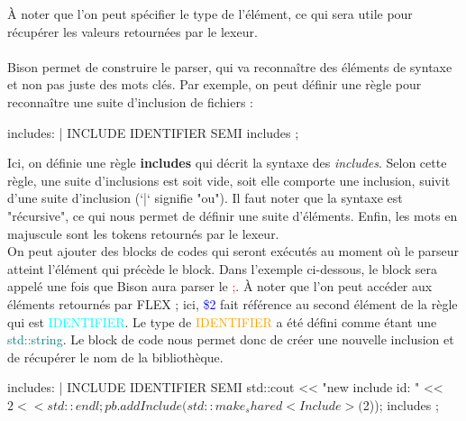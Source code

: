 \documentclass[a4paper]{article}
\begin{document}
\begin{code}
\end{code}\leavevmode\newline

À noter que l'on peut spécifier le type de l'élément, ce qui sera utile pour
récupérer les valeurs retournées par le lexeur.\\~\\


Bison permet de construire le parser, qui va reconnaître des éléments de syntaxe
et non pas juste des mots clés. Par exemple, on peut définir une règle pour
reconnaître une suite d'inclusion de fichiers :\\

\begin{code}[language=c++]
includes: %
       | INCLUDE IDENTIFIER SEMI includes
       ;
\end{code}\leavevmode\newline

Ici, on définie une règle \textbf{includes} qui décrit la syntaxe des \textit{includes}. Selon cette règle, une suite d'inclusions est soit vide, soit elle comporte une inclusion, suivit d'une suite d'inclusion (`|` signifie "ou"). Il faut noter que la syntaxe est "récursive", ce qui nous permet de définir une suite d'éléments.
Enfin, les mots en majuscule sont les tokens retournés par le lexeur.\\

On peut ajouter des blocks de codes qui seront exécutés au moment où le parseur
atteint l'élément qui précède le block. Dans l'exemple ci-dessous, le block sera appelé une fois que Bison aura parser le \textcolor{red}{;}. À noter que l'on peut accéder aux éléments retournés par FLEX ; ici, \textcolor{blue}{\$2} fait référence au second élément de la règle qui est \textcolor{cyan}{IDENTIFIER}. Le type de \textcolor{orange}{IDENTIFIER} a été défini comme étant une \textcolor{teal}{std::string}. Le block de code nous permet donc de créer une nouvelle inclusion et de récupérer le nom de la bibliothèque.\\

\begin{code}[language=c++]
includes: %
       |
       INCLUDE IDENTIFIER SEMI
       {
         std::cout << "new include id: " << $2 << std::endl;
         pb.addInclude(std::make_shared<Include>($2));
       }
       includes
       ;
\end{code}\leavevmode\newline
\end{document}
